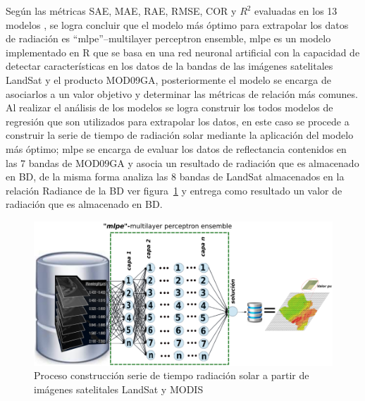 Según las métricas SAE, MAE, RAE, RMSE, COR y $R^2$ evaluadas en los 13 modelos \cite{ASH:2013:Online}, se logra concluir que el modelo más óptimo para extrapolar 
los datos de radiación es ``mlpe''–multilayer perceptron ensemble, mlpe es un modelo implementado en R que se basa en una red neuronal artificial con la capacidad 
de detectar características en los datos de la bandas de las imágenes satelitales LandSat y el producto MOD09GA, posteriormente el modelo se encarga de asociarlos 
a un valor objetivo y determinar las métricas de relación más comunes. Al realizar el análisis de los modelos se logra construir los todos modelos de regresión que 
son utilizados para extrapolar los datos, en este caso se procede a construir la serie de tiempo de radiación solar mediante la aplicación del modelo más óptimo; 
mlpe se encarga de evaluar los datos de reflectancia contenidos en las 7 bandas de MOD09GA y asocia un resultado de radiación que es almacenado en BD, de la misma 
forma analiza las 8 bandas de LandSat almacenados en la relación Radiance de la BD ver figura~\ref{fig:mlpe} y entrega como resultado un valor de radiación que es 
almacenado en BD.

\begin{figure}[htb]
  \centering 
  \includegraphics[scale=0.43]{pictures/mlpe.png}
  \caption{Proceso construcción serie de tiempo radiación solar a partir de imágenes satelitales LandSat y MODIS} 
  \label{fig:mlpe}
\end{figure}


